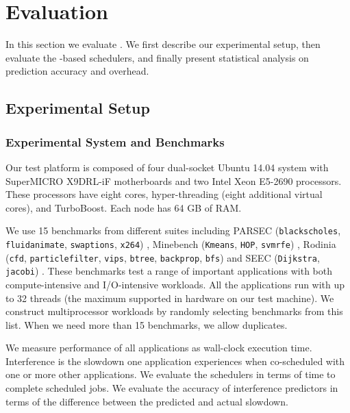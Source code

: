 
\section{Evaluation} 
In this section we evaluate \SYSTEM{}. We first describe our
experimental setup, then evaluate the \SYSTEM{}-based schedulers, and
finally present statistical analysis on \SYSTEM{} prediction accuracy
and overhead.

\subsection{Experimental Setup}
\label{sec:setup}

\subsubsection{Experimental System and Benchmarks}
Our test platform is composed of four dual-socket Ubuntu 14.04 system
with SuperMICRO X9DRL-iF motherboards and two Intel Xeon E5-2690
processors.  These processors have eight cores, hyper-threading (eight
additional virtual cores), and TurboBoost.  Each node has 64 GB of
RAM.

We use 15 benchmarks from different suites including PARSEC
(\texttt{blackscholes}, \texttt{fluidanimate}, \texttt{swaptions},
\texttt{x264}) \cite{parsec}, Minebench (\texttt{Kmeans},
\texttt{HOP}, \texttt{svmrfe}) \cite{minebench}, Rodinia
(\texttt{cfd}, \texttt{particlefilter}, \texttt{vips}, \texttt{btree},
\texttt{backprop}, \texttt{bfs}) \cite{rodinia} and SEEC
(\texttt{Dijkstra}, \texttt{jacobi}) \cite{hoffmann2011seec}. These
benchmarks test a range of important applications with both
compute-intensive and I/O-intensive workloads.  All the applications
run with up to 32 threads (the maximum supported in hardware on our
test machine).  We construct multiprocessor workloads by randomly
selecting benchmarks from this list.  When we need more than 15
benchmarks, we allow duplicates.

We measure performance of all applications as wall-clock execution
time.  Interference is the slowdown one application experiences when
co-scheduled with one or more other applications.  We evaluate the
schedulers in terms of time to complete scheduled jobs.  We evaluate
the accuracy of interference predictors in terms of the difference
between the predicted and actual slowdown.

